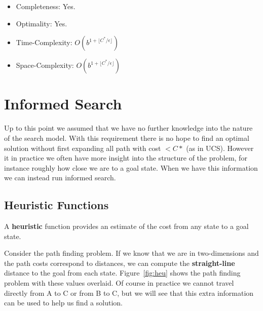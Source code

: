 \documentclass[11pt]{article}
\begin{document}
\begin{itemize}
\item Completeness: Yes.  
\item Optimality: Yes.
\item Time-Complexity: $O(b^{1 +\lfloor C^*/\epsilon \rfloor } )$ 
\item Space-Complexity: $O(b^{1 +\lfloor C^*/\epsilon \rfloor } )$
\end{itemize}


\section{Informed Search}

Up to this point we assumed that we have no further knowledge into the
nature of the search model. With this requirement there is no hope to
find an optimal solution without first expanding all path with cost $<
C*$ (as in UCS).  However it in practice we often have more insight
into the structure of the problem, for instance roughly how close we 
are to a goal state. When we have this information we can instead run 
informed search.

\subsection{Heuristic Functions}

A \textbf{heuristic} function provides an estimate of the cost from 
any state to a goal state.  

Consider the path finding problem. If we know that we are in
two-dimensions and the path costs correspond to distances, we can
compute the \textbf{straight-line} distance to the goal from each
state. Figure~\ref{fig:heu} shows the path finding problem with these
values overlaid. Of course in practice we cannot travel directly
from A to C or from B to C, but we will see that this extra
information can be used to help us find a solution.

\end{document}
